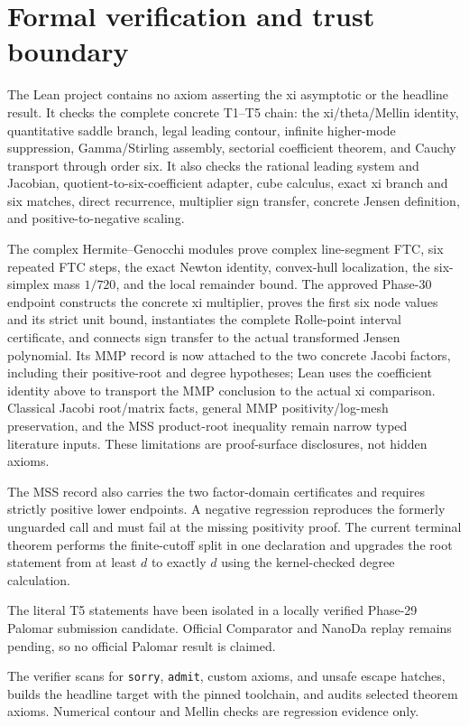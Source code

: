 \documentclass[11pt]{article}
\theoremstyle{definition}
\theoremstyle{remark}
\begin{document}
\section{Formal verification and trust boundary}\label{sec:formal}

The Lean project contains no axiom asserting the xi asymptotic or the headline
result.  It checks the complete concrete T1--T5 chain: the xi/theta/Mellin
identity, quantitative saddle branch, legal leading contour, infinite
higher-mode suppression, Gamma/Stirling assembly, sectorial coefficient
theorem, and Cauchy transport through order six.  It also checks the rational
leading system and Jacobian, quotient-to-six-coefficient adapter, cube
calculus, exact xi branch and six matches, direct recurrence, multiplier sign
transfer, concrete Jensen definition, and positive-to-negative scaling.

The complex Hermite--Genocchi modules prove complex line-segment FTC, six
repeated FTC steps, the exact Newton identity, convex-hull localization, the
six-simplex mass $1/720$, and the local remainder bound.  The approved
Phase-30 endpoint constructs the concrete xi multiplier, proves the first six
node values and its strict unit bound, instantiates the complete
Rolle-point interval certificate, and connects sign transfer to the actual
transformed Jensen polynomial.  Its MMP record is now attached to the two
concrete Jacobi factors, including their positive-root and degree hypotheses;
Lean uses the coefficient identity above to transport the MMP conclusion to
the actual xi comparison.  Classical Jacobi root/matrix facts, general MMP
positivity/log-mesh preservation, and the MSS product-root inequality remain
narrow typed literature inputs.  These limitations are proof-surface
disclosures, not hidden axioms.

The MSS record also carries the two factor-domain certificates and requires
strictly positive lower endpoints.  A negative regression reproduces the
formerly unguarded call and must fail at the missing positivity proof.  The
current terminal theorem performs the finite-cutoff split in one declaration
and upgrades the root statement from at least $d$ to exactly $d$ using the
kernel-checked degree calculation.

The literal T5 statements have been isolated in a locally verified Phase-29
Palomar submission candidate.  Official Comparator and NanoDa replay remains
pending, so no official Palomar result is claimed.

The verifier scans for \texttt{sorry}, \texttt{admit}, custom axioms, and
unsafe escape hatches, builds the headline target with the pinned toolchain,
and audits selected theorem axioms.  Numerical contour and Mellin checks are
regression evidence only.
\end{document}
